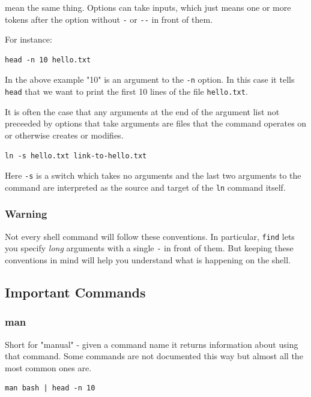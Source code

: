 \documentclass[11pt]{article}
\begin{document}
mean the same thing. Options can take inputs, which just means one
or more tokens after the option without \texttt{-} or \texttt{-{}-} in front of
them.

For instance:

\begin{verbatim}
head -n 10 hello.txt
\end{verbatim}

In the above example "10" is an argument to the \texttt{-n} option. In
this case it tells \texttt{head} that we want to print the first 10 lines
of the file \texttt{hello.txt}.

It is often the case that any arguments at the end of the argument
list not preceeded by options that take arguments are files that
the command operates on or otherwise creates or modifies.

\begin{verbatim}
ln -s hello.txt link-to-hello.txt
\end{verbatim}

Here \texttt{-s} is a switch which takes no arguments and the last two
arguments to the command are interpreted as the source and target
of the \texttt{ln} command itself.

\subsubsection{Warning}
\label{sec:org31b5a48}

Not every shell command will follow these conventions. In
particular, \texttt{find} lets you specify \emph{long} arguments with a single
\texttt{-} in front of them. But keeping these conventions in mind will
help you understand what is happening on the shell.

\subsection{Important Commands}
\label{sec:org9b1ec0f}

\subsubsection{man}
\label{sec:org1e7cbe1}

Short for "manual" - given a command name it returns information about
using that command. Some commands are not documented this way but
almost all the most common ones are.

\begin{verbatim}
man bash | head -n 10
\end{verbatim}
\end{document}
